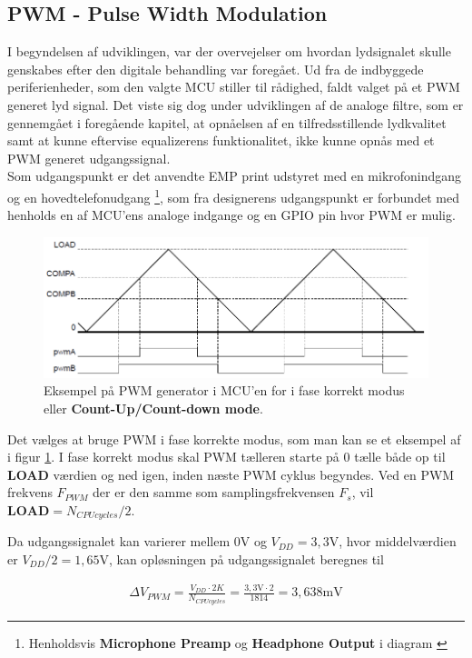 \subsection{PWM - Pulse Width Modulation}
I begyndelsen af udviklingen, var der overvejelser om hvordan lydsignalet skulle genskabes efter den digitale behandling var foregået.
Ud fra de indbyggede periferienheder, som den valgte MCU stiller til rådighed, faldt valget på et PWM generet lyd signal.
Det viste sig dog under udviklingen af de analoge filtre, som er gennemgået i foregående kapitel, at opnåelsen af en tilfredsstillende lydkvalitet samt at kunne eftervise equalizerens funktionalitet, ikke kunne opnås med et PWM generet udgangssignal. 
\\

Som udgangspunkt er det anvendte EMP print udstyret med en mikrofonindgang og en hovedtelefonudgang \footnote{Henholdsvis \textbf{Microphone Preamp} og \textbf{Headphone Output} i diagram \cite{emp-diagram}}, som fra designerens udgangspunkt er forbundet med henholds en af MCU'ens analoge indgange og en GPIO pin hvor PWM er mulig.

\begin{figure}[h!]
	\centering
	\includegraphics[width=.7\textwidth]{billeder/pwm.png}
	\caption{Eksempel på PWM generator i MCU'en for i fase korrekt modus eller \textbf{Count-Up/Count-down mode}\cite[Fig. 20-5 s. 1232]{tm4c123gh6pm}.}
	\label{fig:pwm}
\end{figure}

Det vælges at bruge PWM i fase korrekte modus, som man kan se et eksempel af i figur \ref{fig:pwm}.
I fase korrekt modus skal PWM tælleren starte på 0 tælle både op til \textbf{LOAD} værdien og ned igen, inden næste PWM cyklus begyndes.
Ved en PWM frekvens $F_{PWM}$ der er den samme som samplingsfrekvensen $F_s$, vil $\textbf{LOAD} = N_{CPU cycles} / 2$.

Da udgangssignalet kan varierer mellem $ 0 \si{\volt}$ og $V_{DD} = 3,3 \si{\volt}$, hvor middelværdien er $V_{DD}/2 = 1,65 \si{\volt}$, kan opløsningen på udgangssignalet beregnes til 

\begin{align}
\Delta V_{PWM} = \frac{V_{DD} \cdot 2K}{N_{CPU cycles}} = \frac{3,3\si{\volt} \cdot 2}{1814} =  3,638\si{\milli\volt}
\end{align}

